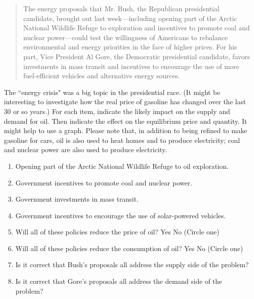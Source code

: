 \documentclass{article}
\begin{document}
\begin{enumerate}
\begin{EXAM}
\begin{quote}
The energy proposals that Mr. Bush, the Republican presidential candidate, brought out last week---including opening part of the Arctic National Wildlife Refuge to exploration and incentives to promote coal and nuclear power---could test the willingness of Americans to rebalance environmental and energy priorities in the face of higher prices. For his part, Vice President Al Gore, the Democratic presidential candidate, favors investments in mass transit and incentives to encourage the use of more fuel-efficient vehicles and alternative energy sources.
\end{quote}
%
The ``energy crisis" was a big topic in the presidential race. (It might be interesting to investigate how the real price of gasoline has changed over the last 30 or so years.) For each item, indicate the likely impact on the supply and demand for oil. Then indicate the effect on the equilibrium price and quantity. It might help to use a graph. Please note that, in addition to being refined to make gasoline for cars, oil is also used to heat homes and to produce electricity; coal and nuclear power are also used to produce electricity.

    \begin{enumerate}
    \item Opening part of the Arctic National Wildlife Refuge to oil exploration.
    \item Government incentives to promote coal and nuclear power.
    \item Government investments in mass transit.
    \item Government incentives to encourage the use of solar-powered vehicles.
    \item Will all of these policies reduce the price of oil? Yes  No (Circle one)
    \item Will all of these policies reduce the consumption of oil? Yes  No (Circle one)
    \item Is it correct that Bush's proposals all address the supply side of the problem? %
    \item Is it correct that Gore's proposals all address the demand side of the problem? %
    \end{enumerate}\end{EXAM}


\end{enumerate}
\end{document}
